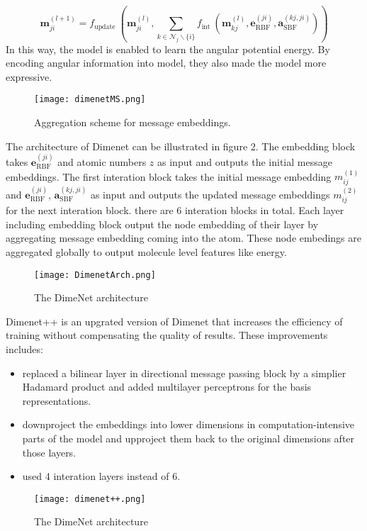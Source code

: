 \begin{equation}
    \boldsymbol{m}_{j i}^{(l+1)}=f_{\text {update }}\left(\boldsymbol{m}_{j i}^{(l)}, \sum_{k \in \mathcal{N}_{j} \backslash\{i\}} f_{\text {int }}\left(\boldsymbol{m}_{k j}^{(l)}, \boldsymbol{e}_{\mathrm{RBF}}^{(j i)}, \boldsymbol{a}_{\mathrm{SBF}}^{(k j, j i)}\right)\right)
\end{equation}
In this way, the model is enabled to learn the angular potential energy. By encoding angular information into model, they also made the model more expressive.\\
\begin{figure}
    \texttt{[image: dimenetMS.png]}
    \caption{Aggregation
    scheme for message
    embeddings. \cite*{DBLP:journals/corr/abs-2003-03123}}
    \label{fig:one}
  \end{figure}
The architecture of Dimenet can be illustrated in figure 2. The embedding block takes $\boldsymbol{e}_{\mathrm{RBF}}^{(j i)}$ and atomic numbers $z$ as input and outputs the initial message embeddings. The first interation block takes the initial message embedding $m_{ij}^{(1)}$ and $\boldsymbol{e}_{\mathrm{RBF}}^{(j i)}$, $\boldsymbol{a}_{\mathrm{SBF}}^{(k j, j i)}$ as input and outputs the updated message embeddings $m_{ij}^{(2)}$ for the next interation block. there are 6 interation blocks in total. Each layer including embedding block output the node embedding of their layer by aggregating message embedding coming into the atom. These node embedings are aggregated globally to output molecule level features like energy.\\
\begin{figure}
    \texttt{[image: DimenetArch.png]}
    \caption{The DimeNet architecture \cite*{DBLP:journals/corr/abs-2003-03123}}
    \label{fig:one}
  \end{figure}
Dimenet++ is an upgrated version of Dimenet that increases the efficiency of training without compensating the quality of results. These improvements includes: \\
\begin{itemize}
    \item replaced a bilinear layer in directional message passing block by a simplier Hadamard product and added multilayer perceptrons for the basis representations.
    \item downproject the embeddings into lower dimensions in computation-intensive parts of the model and upproject them back to the original dimensions after those layers.
    \item used 4 interation layers instead of 6. 
\end{itemize}

\begin{figure}
\texttt{[image: dimenet++.png]}
\caption{The DimeNet architecture \cite*{https://doi.org/10.48550/arxiv.2003.03123}}
\label{fig:one}
\end{figure}

